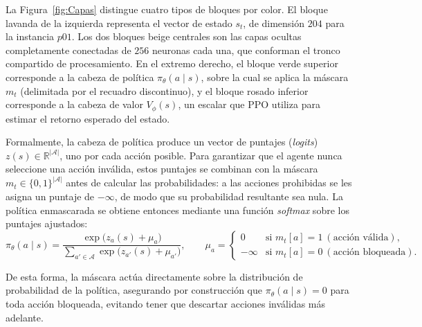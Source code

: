 La Figura~\ref{fig:Capas} distingue cuatro tipos de bloques por color. El bloque lavanda de la izquierda representa el vector de estado $s_t$, de dimensión $204$ para la instancia $p01$. Los dos bloques beige centrales son las capas ocultas completamente conectadas de $256$ neuronas cada una, que conforman el tronco compartido de procesamiento. En el extremo derecho, el bloque verde superior corresponde a la cabeza de política $\pi_\theta(a \mid s)$, sobre la cual se aplica la máscara $m_t$ (delimitada por el recuadro discontinuo), y el bloque rosado inferior corresponde a la cabeza de valor $V_\phi(s)$, un escalar que PPO utiliza para estimar el retorno esperado del estado.


Formalmente, la cabeza de política produce un vector de puntajes (\textit{logits}) $z(s) \in \mathbb{R}^{|\mathcal{A}|}$, uno por cada acción posible. Para garantizar que el agente nunca seleccione una acción inválida, estos puntajes se combinan con la máscara $m_t \in \{0,1\}^{|\mathcal{A}|}$ antes de calcular las probabilidades: a las acciones prohibidas se les asigna un puntaje de $-\infty$, de modo que su probabilidad resultante sea nula. La política enmascarada se obtiene entonces mediante una función \textit{softmax} sobre los puntajes ajustados:
\begin{equation}
    \label{eq:politica_enmascarada}
    \pi_{\theta}(a \mid s) =
    \frac{\exp\!\big(z_a(s) + \mu_a\big)}
         {\sum_{a' \in \mathcal{A}} \exp\!\big(z_{a'}(s) + \mu_{a'}\big)},
    \qquad
    \mu_a =
    \begin{cases}
        0 & \text{si } m_t[a] = 1 \ (\text{acción válida}),\\
        -\infty & \text{si } m_t[a] = 0 \ (\text{acción bloqueada}).
    \end{cases}
\end{equation}

De esta forma, la máscara actúa directamente sobre la distribución de probabilidad de la política, asegurando por construcción que $\pi_{\theta}(a \mid s) = 0$ para toda acción bloqueada, evitando tener que descartar acciones inválidas más adelante.


